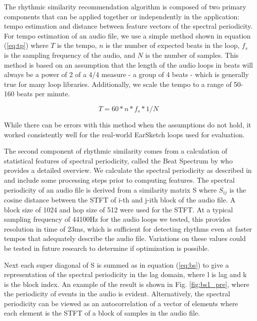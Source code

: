 \documentclass{article}
\begin{document}
The rhythmic similarity recommendation algorithm is composed of two primary components that can be applied together or independently in the application: tempo estimation and distance between feature vectors of the spectral periodicity. For tempo estimation of an audio file, we use a simple method shown in equation (\ref{eq:tp}) where \(T\) is the tempo, \(n\) is the number of expected beats in the loop, \(f_s\) is the sampling frequency of the audio, and \(N\) is the number of samples. This method is based on an assumption that the length of the audio loops in beats will always be a power of 2 of a 4/4 measure - a group of 4 beats - which is generally true for many loop libraries. Additionally, we scale the tempo to a range of 50-160 beats per minute.

\begin{equation}
\label{eq:tp}
T = 60 * n * f_s * 1/N
\end{equation}

While there can be errors with this method when the assumptions do not hold, it worked consistently well for the real-world EarSketch \cite{earsketch} loops used for evaluation.

The second component of rhythmic similarity comes from a calculation of statistical features of spectral periodicity, called the Beat Spectrum by \cite{foote2001beat} who provides a detailed overview. We calculate the spectral periodicity as described in \cite{foote2001beat} and include some processing steps prior to computing features. The spectral periodicity of an audio file is derived from a similarity matrix S where \(S_{ij}\) is the cosine distance between the STFT of i-th and j-ith block of the audio file. A block size of 1024 and hop size of 512 were used for the STFT. At a typical sampling frequency of 44100Hz for the audio loops we tested, this provides resolution in time of 23ms, which is sufficient for detecting rhythms even at faster tempos that adequately describe the audio file. Variations on these values could be tested in future research to determine if optimization is possible.

Next each super diagonal of S is summed as in equation (\ref{eq:bs}) to give a representation of the spectral periodicity in the lag domain, where l is lag and k is the block index. An example of the result is shown in Fig. \ref{fig:bs1_pre}, where the periodicity of events in the audio is evident. Alternatively, the spectral periodicity can be viewed as an autocorrelation of a vector of elements where each element is the STFT of a block of samples in the audio file.
\end{document}
